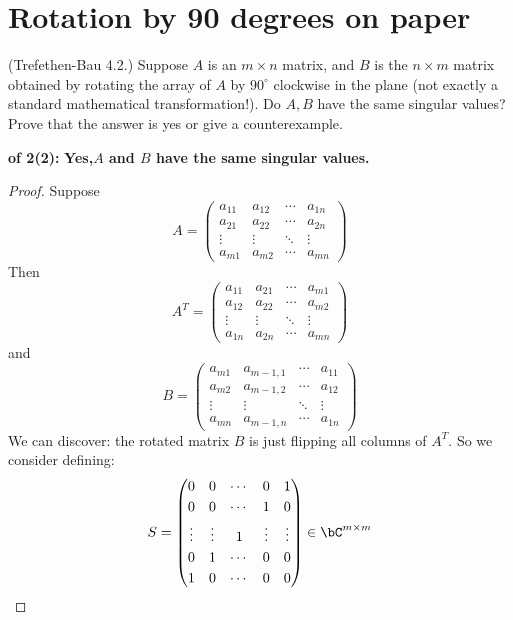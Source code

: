 \documentclass[lang=cn,11pt]{elegantbook}
\begin{document}
\section{Rotation by 90 degrees on paper}
(Trefethen-Bau 4.2.) Suppose $A$ is an $m\times n$ matrix, and $B$ is the $n\times m$ matrix obtained by rotating the array of $A$ by $90^\circ$ clockwise in the plane (not exactly a standard mathematical transformation!). Do $A,B$ have the same singular values? Prove that the answer is yes or give a counterexample.
\begin{solution}
\textbf{ of 2(2):} \textbf{Yes,$A$ and $B$ have the same singular values.}\\
\begin{proof}
Suppose
\[
A = \begin{pmatrix}
a_{11} & a_{12} & \cdots & a_{1n} \\[1mm]
a_{21} & a_{22} & \cdots & a_{2n} \\[1mm]
\vdots & \vdots & \ddots & \vdots \\[1mm]
a_{m1} & a_{m2} & \cdots & a_{mn}
\end{pmatrix}
\]
Then \[
A^T = \begin{pmatrix}
a_{11} & a_{21} & \cdots & a_{m1} \\[1mm]
a_{12} & a_{22} & \cdots & a_{m2} \\[1mm]
\vdots & \vdots & \ddots & \vdots \\[1mm]
a_{1n} & a_{2n} & \cdots & a_{mn}
\end{pmatrix}
\]
and \[
B = \begin{pmatrix}
a_{m1}      & a_{m-1,1}      & \cdots & a_{11}      \\[1mm]
a_{m2}      & a_{m-1,2}      & \cdots & a_{12}      \\[1mm]
\vdots       & \vdots         & \ddots & \vdots       \\[1mm]
a_{mn}      & a_{m-1,n}      & \cdots & a_{1n}
\end{pmatrix}
\]
We can discover: the rotated matrix $B$ is just flipping all columns of $A^T$. So we consider defining:
\[
S = \begin{pmatrix}
0      & 0      & \cdots & 0      & 1\\[1mm]
0      & 0      & \cdots & 1      & 0\\[1mm]
\vdots & \vdots & 1 & \vdots & \vdots\\[1mm]
0      & 1      & \cdots & 0      & 0\\[1mm]
1      & 0      & \cdots & 0      & 0
\end{pmatrix} \in \bC^{m\times m}
\]
\end{proof}
\end{solution}
\end{document}
